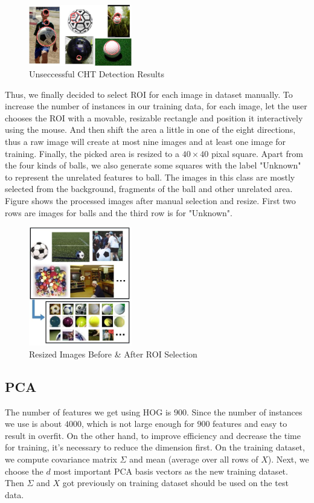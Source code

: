 \documentclass{article}
\begin{document}
\begin{figure}[htp]
\centering
\includegraphics[width=0.4\textwidth]{circleDetection.jpg}
\caption{Unseccessful CHT Detection Results}
\label{fig:cird}
\end{figure}

Thus, we finally decided to select ROI for each image in dataset manually. To increase the number of instances in our training data, for each image, let the user chooses the ROI with a movable, resizable rectangle and position it interactively using the mouse. And then shift the area a little in one of the eight directions, thus a raw image will create at most nine images and at least one image for training. Finally, the picked area is resized to a $40 \times 40$ pixal square. Apart from the four kinds of balls, we also generate some squares with the label "Unknown" to represent the unrelated features to ball. The images in this class are mostly selected from the background, fragments of the ball and other unrelated area. Figure \cite{ROIResult} shows the processed images after manual selection and resize. First two rows are images for balls and the third row is for "Unknown".
\begin{figure}[htp]
\centering
\includegraphics[width=0.4\textwidth]{ROISelection.jpg}
\caption{Resized Images Before \& After ROI Selection}
\label{fig:ROIResult}
\end{figure}

\subsection{PCA}
The number of features we get using HOG is $900$. Since the number of instances we use is about $4000$, which is not large enough for $900$ features and easy to result in overfit. On the other hand, to improve efficiency and decrease the time for training, it's necessary to reduce the dimension first. On the training dataset, we compute covariance matrix $\Sigma$ and mean (average over all rows of $X$). Next, we choose the $d$ most important PCA basis vectors as the new training dataset. Then $\Sigma$ and $X$ got previously on training dataset should be used on the test data.
\end{document}
